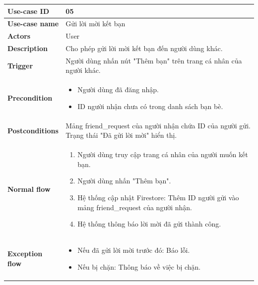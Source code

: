\documentclass[a4paper, 12pt]{article}
\begin{document}
	\begin{longtable}{|p{3.5cm}|p{12cm}|}
		\hline
		\textbf{Use-case ID} & 05 \\
		\hline
		\textbf{Use-case name} & Gửi lời mời kết bạn \\
		\hline
		\textbf{Actors} & User \\
		\hline
		\textbf{Description} & Cho phép gửi lời mời kết bạn đến người dùng khác. \\
		\hline
		\textbf{Trigger} & Người dùng nhấn nút "Thêm bạn" trên trang cá nhân của người khác. \\
		\hline
		\textbf{Precondition} & 
		\begin{itemize}[label=+]
			\item Người dùng đã đăng nhập.
			\item ID người nhận chưa có trong danh sách bạn bè.
		\end{itemize} \\
		\hline
		\textbf{Postconditions} & Mảng friend\_request của người nhận chứa ID của người gửi. Trạng thái "Đã gửi lời mời" hiển thị. \\
		\hline
		\textbf{Normal flow} & 
		\begin{enumerate}
			\item Người dùng truy cập trang cá nhân của người muốn kết bạn.
			\item Người dùng nhấn "Thêm bạn".
			\item Hệ thống cập nhật Firestore: Thêm ID người gửi vào mảng friend\_request của người nhận.
			\item Hệ thống thông báo lời mời đã gửi thành công.
		\end{enumerate} \\
		\hline
		\textbf{Exception flow} & 
		\begin{itemize}[label={*}]
			\item Nếu đã gửi lời mời trước đó: Báo lỗi.
			\item Nếu bị chặn: Thông báo về việc bị chặn.
		\end{itemize} \\
		\hline
	\end{longtable}
	\vspace{0.5cm}
	
\end{document}
